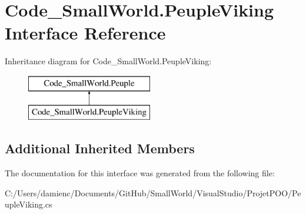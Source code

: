 \hypertarget{interface_code___small_world_1_1_peuple_viking}{\section{Code\-\_\-\-Small\-World.\-Peuple\-Viking Interface Reference}
\label{interface_code___small_world_1_1_peuple_viking}
}
Inheritance diagram for Code\-\_\-\-Small\-World.\-Peuple\-Viking\-:\begin{figure}[H]
\begin{center}
\leavevmode
\includegraphics[height=2.000000cm]{interface_code___small_world_1_1_peuple_viking}
\end{center}
\end{figure}
\subsection*{Additional Inherited Members}


The documentation for this interface was generated from the following file\-:\begin{DoxyCompactItemize}
\item 
C\-:/\-Users/damienc/\-Documents/\-Git\-Hub/\-Small\-World/\-Visual\-Studio/\-Projet\-P\-O\-O/Peuple\-Viking.\-cs\end{DoxyCompactItemize}

